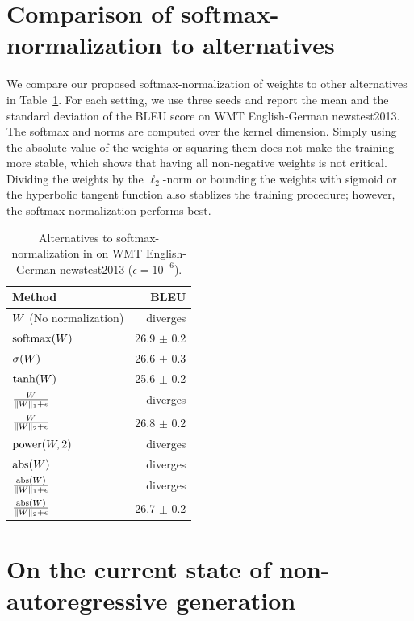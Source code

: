 

\section{Comparison of softmax-normalization to alternatives}
\label{app:smnorm}

We compare our proposed softmax-normalization of weights to other alternatives in Table~\ref{tab:ablation_softmax}. 
For each setting, we use three seeds and report the mean and the standard deviation of the BLEU score on WMT English-German newstest2013. 
The softmax and norms are computed over the kernel dimension. 
Simply using the absolute value of the weights or squaring them does not make the training more stable, which shows that having all non-negative weights is not critical. 
Dividing the weights by the $\ell_2$-norm or bounding the weights with sigmoid or the hyperbolic tangent function also stablizes the training procedure; however, the softmax-normalization performs best.

\begin{table}[h]
\centering
\setlength\extrarowheight{5pt}
\begin{tabular}{lr}
\toprule
Method & BLEU \\
\midrule
${W}$ (No normalization) &  diverges \\
$\mathrm{softmax} ({W})$ & 26.9 $\pm$ 0.2 \\
$\sigma ({W})$ & 26.6 $\pm$ 0.3 \\
$\tanh ({W})$ & 25.6 $\pm$ 0.2 \\
$\frac{{W}}{\lVert {W} \rVert_1 + \epsilon}$ & diverges \\
$\frac{{W}}{\lVert {W} \rVert_2 + \epsilon}$ & 26.8 $\pm$ 0.2 \\
$ \text{power} ({W}, 2) $ & diverges \\
$\text{abs} ({W})$ & diverges \\
$\frac{\text{abs} ({W})}{\lVert {W} \rVert_1 + \epsilon}$ & diverges \\
$\frac{\text{abs} ({W})}{\lVert {W} \rVert_2 + \epsilon}$ & 26.7 $\pm$ 0.2 \\
\bottomrule
\end{tabular}
\caption{Alternatives to softmax-normalization in \tvsdconv{} on WMT English-German newstest2013 ($\epsilon= 10^{-6}$).}
\label{tab:ablation_softmax}
\end{table}


\section{On the current state of non-autoregressive generation}

